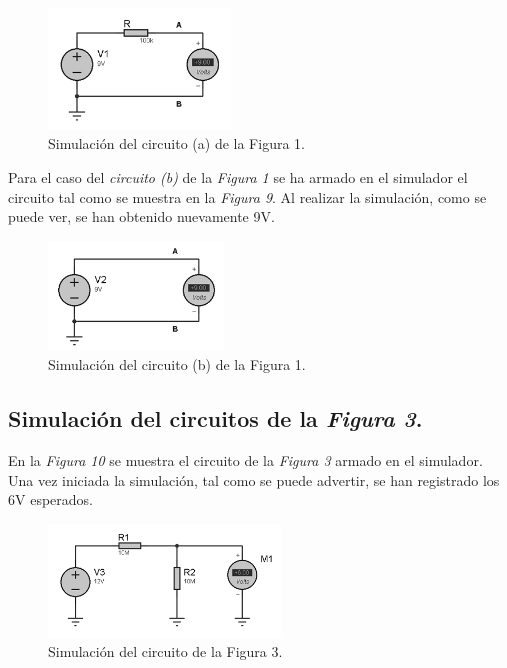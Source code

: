\documentclass{article}
\begin{document}
\begin{figure}[h]
	\centering
	\includegraphics[width=0.43\textwidth]{images/apA-fig1-circ-a.jpg}
	\caption{Simulación del circuito (a) de la Figura 1.}
\end{figure}
\bigskip\bigskip


	Para el caso del \textit{circuito (b)} de la \textit{Figura 1} se ha armado en el simulador el circuito tal como se muestra en la \textit{Figura 9}. Al realizar la simulación, como se puede ver, se han obtenido nuevamente 9V.
\bigskip

	
\begin{figure}[h]
	\centering
	\includegraphics[width=0.415\textwidth]{images/apA-fig1-circ-b.jpg}
	\caption{Simulación del circuito (b) de la Figura 1.}
\end{figure}
\bigskip\bigskip



\subsection*{Simulación del circuitos de la \textit{Figura 3}.}
\medskip

	En la \textit{Figura 10} se muestra el circuito de la \textit{Figura 3} armado en el simulador. Una vez iniciada la simulación, tal como se puede advertir, se han registrado los 6V esperados.

\newpage
\begin{figure}[h]
	\centering
	\includegraphics[width=0.549\textwidth]{images/apA-fig2.jpg}
	\caption{Simulación del circuito de la Figura 3.}
\end{figure}
\bigskip
\end{document}
